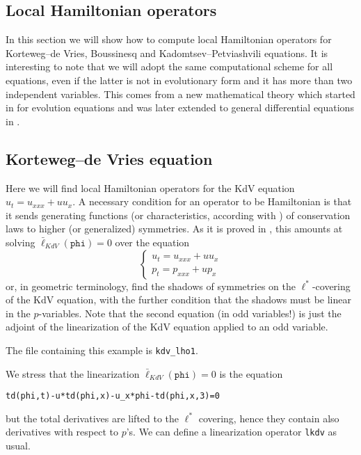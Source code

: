 \subsection{Local Hamiltonian operators}
\label{cdesec:local-hamilt-oper}

In this section we will show how to compute local Hamiltonian operators for
Korteweg--de Vries, Boussinesq and Kadomtsev--Petviashvili equations. It is
interesting to note that we will adopt the same computational scheme for all
equations, even if the latter is not in evolutionary form and it has more than
two independent variables. This comes from a new mathematical theory which
started in \cite{KerstenKrasilshchikVerboretsky:2004} for evolution equations and was later extended to general
differential equations in \cite{KerstenKrasilshchikVerbovetskyVitolo:HSGP}.

\subsection{Korteweg--de Vries equation}
\label{cdesec:korteweg-de-vries}

Here we will find local Hamiltonian operators for the KdV equation
$u_t=u_{xxx}+uu_x$. A necessary condition for an operator to be Hamiltonian is
that it sends generating functions (or characteristics, according with
\cite{Olver:93}) of conservation laws to higher (or generalized) symmetries.
As it is proved in \cite{KerstenKrasilshchikVerboretsky:2004}, this amounts at solving $\bar
\ell_{KdV}(\mathtt{phi})=0$ over the equation
\begin{displaymath}
  \left\{\begin{array}{l}
    u_t=u_{xxx}+uu_x\\
    p_t=p_{xxx}+up_x
  \end{array}\right.
\end{displaymath}
or, in geometric terminology, find the shadows of symmetries on the
$\ell^*$-covering of the KdV equation, with the further condition that the
shadows must be linear in the $p$-variables. Note that the second equation (in
odd variables!) is just the adjoint of the linearization of the KdV equation
applied to an odd variable.

The file containing this example is \texttt{kdv\_lho1}.

We stress that the linearization $\bar \ell_{KdV}(\mathtt{phi})=0$ is the
equation
\begin{verbatim}
td(phi,t)-u*td(phi,x)-u_x*phi-td(phi,x,3)=0
\end{verbatim}
but the total derivatives are lifted to the $\ell^*$ covering, hence they
contain also derivatives with respect to $p$'s. We can define a linearization
operator \texttt{lkdv} as usual.

